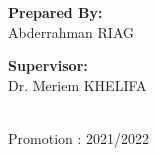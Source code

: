         \begin{center}
                \vspace{0.2cm}
                \hspace{2cm} 
                \begin{minipage}[t][\height][t]{.3\linewidth}
                    \textbf{{\large Prepared By:}}\\
                    {\large Abderrahman RIAG}

                \end{minipage}
                \hfill
                \begin{minipage}[t][\height][t]{.3\linewidth}
                    \textbf{{\large Supervisor:}}\\
                    {\large Dr. Meriem KHELIFA}
                \end{minipage}\\\vfill
                {\normalsize Promotion : 2021/2022}
        \end{center}
    